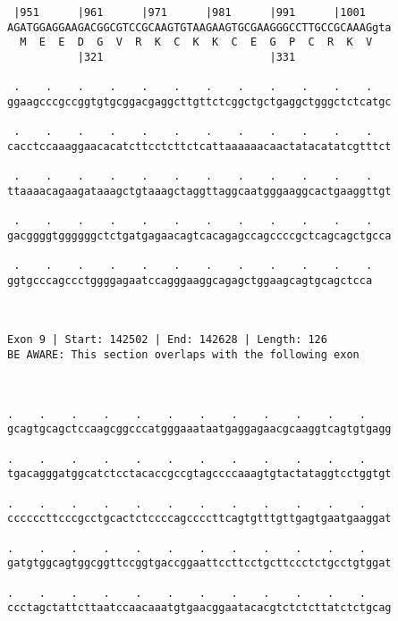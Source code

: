 \documentclass{article}
\begin{document}
\begin{Verbatim}
 |951      |961      |971      |981      |991      |1001    
AGATGGAGGAAGACGGCGTCCGCAAGTGTAAGAAGTGCGAAGGGCCTTGCCGCAAAGgta
  M  E  E  D  G  V  R  K  C  K  K  C  E  G  P  C  R  K  V   
           |321                          |331               
  
 .    .    .    .    .    .    .    .    .    .    .    .   
ggaagcccgccggtgtgcggacgaggcttgttctcggctgctgaggctgggctctcatgc
                                                            
 .    .    .    .    .    .    .    .    .    .    .    .   
cacctccaaaggaacacatcttcctcttctcattaaaaaacaactatacatatcgtttct
                                                            
 .    .    .    .    .    .    .    .    .    .    .    .   
ttaaaacagaagataaagctgtaaagctaggttaggcaatgggaaggcactgaaggttgt
                                                            
 .    .    .    .    .    .    .    .    .    .    .    .   
gacggggtggggggctctgatgagaacagtcacagagccagccccgctcagcagctgcca
                                                            
 .    .    .    .    .    .    .    .    .    .    .    .
ggtgcccagccctggggagaatccagggaaggcagagctggaagcagtgcagctcca
                                                         
                                                         
 
Exon 9 | Start: 142502 | End: 142628 | Length: 126
BE AWARE: This section overlaps with the following exon



.    .    .    .    .    .    .    .    .    .    .    .    
gcagtgcagctccaagcggcccatgggaaataatgaggagaacgcaaggtcagtgtgagg
                                                            
.    .    .    .    .    .    .    .    .    .    .    .    
tgacagggatggcatctcctacaccgccgtagccccaaagtgtactataggtcctggtgt
                                                            
.    .    .    .    .    .    .    .    .    .    .    .    
ccccccttcccgcctgcactctccccagccccttcagtgtttgttgagtgaatgaaggat
                                                            
.    .    .    .    .    .    .    .    .    .    .    .    
gatgtggcagtggcggttccggtgaccggaattccttcctgcttccctctgcctgtggat
                                                            
.    .    .    .    .    .    .    .    .    .    .    .    
ccctagctattcttaatccaacaaatgtgaacggaatacacgtctctcttatctctgcag
                                                            

\end{Verbatim}
\end{document}
